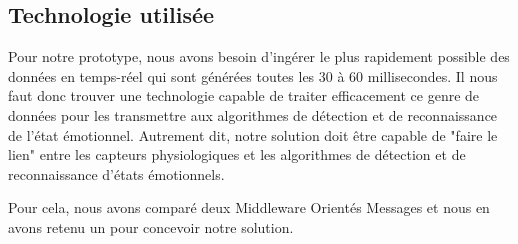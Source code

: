 \documentclass[11pt]{article}
\begin{document}
	\subsection{Technologie utilisée}\label{sec:prototech}
		Pour notre prototype, nous avons besoin d'ingérer le plus rapidement possible des données en temps-réel qui sont générées toutes les 30 à 60 millisecondes.
		Il nous faut donc trouver une technologie capable de traiter efficacement ce genre de données pour les transmettre aux algorithmes de détection et de reconnaissance de l'état émotionnel.
		Autrement dit, notre solution doit être capable de "faire le lien" entre les capteurs physiologiques et les algorithmes de détection et de reconnaissance d'états émotionnels.\par
		Pour cela, nous avons comparé deux Middleware Orientés Messages et nous en avons retenu un pour concevoir notre solution.
\end{document}
